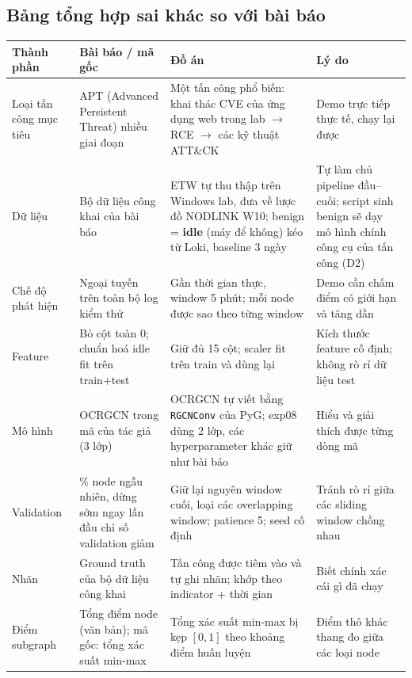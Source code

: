 \subsection{Bảng tổng hợp sai khác so với bài báo}
\label{sec:dev-table}

\begin{table}[H]
\centering
\scriptsize
\renewcommand{\arraystretch}{1.25}
\begin{tabularx}{\textwidth}{>{\raggedright\arraybackslash}p{2.1cm} >{\raggedright\arraybackslash}X >{\raggedright\arraybackslash}X >{\raggedright\arraybackslash}X}
\toprule
\textbf{Thành phần} & \textbf{Bài báo / mã gốc} & \textbf{Đồ án} & \textbf{Lý do} \\
\midrule
Loại tấn công mục tiêu & APT (Advanced Persistent Threat) nhiều giai đoạn & Một tấn công phổ biến: khai thác CVE của ứng dụng web trong lab $\rightarrow$ RCE $\rightarrow$ các kỹ thuật ATT\&CK & Demo trực tiếp thực tế, chạy lại được \\
Dữ liệu & Bộ dữ liệu công khai của bài báo & ETW tự thu thập trên Windows lab, đưa về lược đồ NODLINK W10; benign = \textbf{idle} (máy để không) kéo từ Loki, baseline 3 ngày & Tự làm chủ pipeline đầu--cuối; script sinh benign sẽ dạy mô hình chính công cụ của tấn công (D2) \\
Chế độ phát hiện & Ngoại tuyến trên toàn bộ log kiểm thử & Gần thời gian thực, window 5 phút; mỗi node được sao theo từng window & Demo cần chấm điểm có giới hạn và tăng dần \\
Feature & Bỏ cột toàn 0; chuẩn hoá idle fit trên train+test & Giữ đủ 15 cột; scaler fit trên train và dùng lại & Kích thước feature cố định; không rò rỉ dữ liệu test \\
Mô hình & OCRGCN trong mã của tác giả (3 lớp) & OCRGCN tự viết bằng \texttt{RGCNConv} của PyG; exp08 dùng 2 lớp, các hyperparameter khác giữ như bài báo & Hiểu và giải thích được từng dòng mã \\
Validation & 15\% node ngẫu nhiên, dừng sớm ngay lần đầu chỉ số validation giảm & Giữ lại nguyên window cuối, loại các overlapping window; patience 5; seed cố định & Tránh rò rỉ giữa các sliding window chồng nhau \\
Nhãn & Ground truth của bộ dữ liệu công khai & Tấn công được tiêm vào và tự ghi nhãn; khớp theo indicator + thời gian & Biết chính xác cái gì đã chạy \\
Điểm subgraph & Tổng điểm node (văn bản); mã gốc: tổng xác suất min-max & Tổng xác suất min-max bị kẹp $[0,1]$ theo khoảng điểm huấn luyện & Điểm thô khác thang đo giữa các loại node \\

\end{tabularx}
\end{table}
